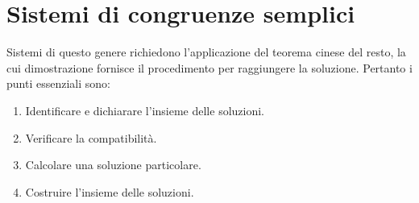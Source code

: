 
\section{Sistemi di congruenze semplici}
Sistemi di questo genere richiedono l'applicazione del teorema cinese
del resto, la cui dimostrazione fornisce il procedimento per raggiungere la
soluzione. Pertanto i punti essenziali sono:
\begin{enumerate}
\item Identificare e dichiarare l'insieme delle soluzioni.
\item Verificare la compatibilità.
\item Calcolare una soluzione particolare.
\item Costruire l'insieme delle soluzioni.
\end{enumerate}


